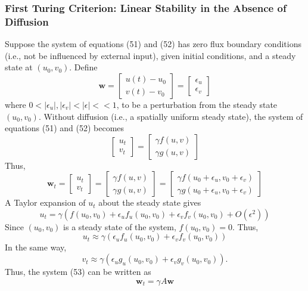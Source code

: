 \documentclass[]{article}
\numberwithin{equation}{section}		%
\begin{document}
\subsubsection{First Turing Criterion: Linear Stability in the Absence of Diffusion}
Suppose the system of equations (51) and (52) has zero flux boundary conditions (i.e., not be influenced by external input), given initial conditions, and a steady state at $(u_0, v_0)$. Define
$$\textbf{w}=\begin{bmatrix}
u(t)-u_0\\
v(t)-v_0
\end{bmatrix}
=\begin{bmatrix}
\epsilon_u\\
\epsilon_v
\end{bmatrix}$$
where $0 < |\epsilon_u|, |\epsilon_v| < |\epsilon| << 1$, to be a perturbation from the steady state $(u_0, v_0)$. Without diffusion (i.e., a spatially uniform steady state), the system of equations (51) and (52) becomes
$$\begin{bmatrix}
u_t\\
v_t
\end{bmatrix}
=\begin{bmatrix}
\gamma f(u,v)\\
\gamma g(u,v)
\end{bmatrix}$$
Thus,
\begin{equation}\textbf{w}_t=\begin{bmatrix}
u_t\\
v_t
\end{bmatrix}
=\begin{bmatrix}
\gamma f(u,v)\\
\gamma g(u,v)
\end{bmatrix}
=\begin{bmatrix}
\gamma f(u_0+\epsilon_u,v_0+\epsilon_v)\\
\gamma g(u_0+\epsilon_u,v_0+\epsilon_v)
\end{bmatrix}\end{equation}
A Taylor expansion of $u_t$ about the steady state gives
$$u_t=\gamma(f(u_0,v_0)+\epsilon_u f_u(u_0,v_0)+\epsilon_v f_v(u_0,v_0)+O(\epsilon^2))$$
Since $(u_0,v_0)$ is a steady state of the system, $f(u_0,v_0)=0$. Thus,
$$u_t \approx \gamma(\epsilon_u f_u(u_0,v_0)+\epsilon_v f_v(u_0,v_0))$$
In the same way,
$$v_t \approx \gamma(\epsilon_u g_u(u_0,v_0)+\epsilon_v g_v(u_0,v_0)).$$
Thus, the system (53) can be written as
\begin{equation}
\textbf{w}_t=\gamma A \textbf{w}
\end{equation}
\end{document}
